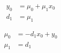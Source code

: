 \begin{align}
  y_0 & = \mu_0+\mu_1 x_0  \\
   d_1 & = \mu_1  
\end{align}

 
\begin{align}
  \mu_0 & =  - d_1 x_0+y_0  \\
   \mu_1 & = d_1  
\end{align}
